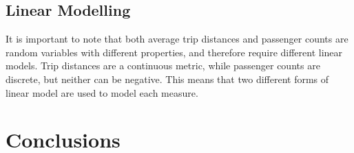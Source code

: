 \documentclass[11pt]{article}
\begin{document}
\subsection{Linear Modelling}
It is important to note that both average trip distances and passenger counts 
are random variables with different properties, and therefore require different linear models.
Trip distances are a continuous metric, while passenger counts are discrete, but neither can be negative.
This means that two different forms of linear model are used to model each measure.







\section{Conclusions}
\end{document}

